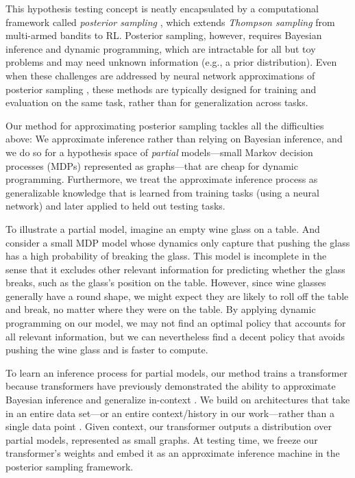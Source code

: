 \documentclass[sigconf]{aamas}
\begin{document}
This hypothesis testing concept is neatly encapsulated by a computational framework called \textit{posterior sampling} \cite{strensBayesianFrameworkReinforcement2000,osbandMoreEfficientReinforcement2013}, which extends \textit{Thompson sampling} \cite{thompsonLikelihoodThatOne1933} from multi-armed bandits to RL. Posterior sampling, however, requires Bayesian inference and dynamic programming, which are intractable for all but toy problems and may need unknown information (e.g., a prior distribution). Even when these challenges are addressed by neural network approximations of posterior sampling \citep[e.g.,][]{osbandDeepExplorationRandomized2019,osbandDeepExplorationBootstrapped2016,azizzadenesheliEfficientExplorationBayesian2019,liptonBBQNetworksEfficientExploration2018,fortunatoNoisyNetworksExploration2018}, these methods are typically designed for training and evaluation on the same task, rather than for generalization across tasks.

Our method for approximating posterior sampling tackles all the difficulties above: We approximate inference rather than relying on Bayesian inference, and we do so for a hypothesis space of \textit{partial} models---small Markov decision processes (MDPs) represented as graphs---that are cheap for dynamic programming. Furthermore, we treat the approximate inference process as generalizable knowledge that is learned from training tasks (using a neural network) and later applied to held out testing tasks.

To illustrate a partial model, imagine an empty wine glass on a table. And consider a small MDP model whose dynamics only capture that pushing the glass has a high probability of breaking the glass. This model is incomplete in the sense that it excludes other relevant information for predicting whether the glass breaks, such as the glass's position on the table. However, since wine glasses generally have a round shape, we might expect they are likely to roll off the table and break, no matter where they were on the table. By applying dynamic programming on our model, we may not find an optimal policy that accounts for all relevant information, but we can nevertheless find a decent policy that avoids pushing the wine glass and is faster to compute.

To learn an inference process for partial models, our method trains a transformer \cite{vaswaniAttentionAllYou2017} because transformers have previously demonstrated the ability to approximate Bayesian inference \cite{mullerTransformersCanBayesian2022,xieExplanationIncontextLearning2022} and generalize in-context \cite{brownLanguageModelsAre2020,gargWhatCanTransformers2022}. We build on architectures that take in an entire data set---or an entire context/history in our work---rather than a single data point \cite{kossenSelfAttentionDatapointsGoing2021,goyalRetrievalAugmentedReinforcementLearning2022,keLearningInduceCausal2022,mullerTransformersCanBayesian2022}. Given context, our transformer outputs a distribution over partial models, represented as small graphs.
At testing time, we freeze our transformer's weights and embed it as an approximate inference machine in the posterior sampling framework.
\end{document}
